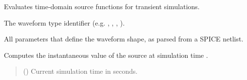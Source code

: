 \documentclass[letterpaper,10pt,english]{sphinxmanual}
\begin{document}
\begin{fulllineitems}
\label{\detokenize{waveforms:Waveform}}
\pysigstartsignatures
\pysiglinewithargsret
{}
{}
{}
\pysigstopsignatures
\sphinxAtStartPar
Evaluates time‑domain source functions for transient simulations.

\begin{fulllineitems}
\label{\detokenize{waveforms:Waveform.type}}
\pysigstartsignatures
\pysigline
{}
\pysigstopsignatures
\sphinxAtStartPar
{} \textendash{} The waveform type identifier (e.g. , , , ).

\end{fulllineitems}


\begin{fulllineitems}
\label{\detokenize{waveforms:Waveform.params}}
\pysigstartsignatures
\pysigline
{}
\pysigstopsignatures
\sphinxAtStartPar
{} \textendash{} All parameters that define the waveform shape, as parsed from a SPICE netlist.

\end{fulllineitems}


\begin{fulllineitems}
\label{\detokenize{waveforms:Waveform.get_value}}
\pysigstartsignatures
\pysiglinewithargsret
{}
{}
{}
\pysigstopsignatures
\sphinxAtStartPar
Computes the instantaneous value of the source at simulation time .
\begin{quote}\begin{description}
\sphinxAtStartPar
{} () \textendash{} Current simulation time in seconds.


\end{description}
\end{quote}
\end{fulllineitems}
\end{fulllineitems}
\end{document}
